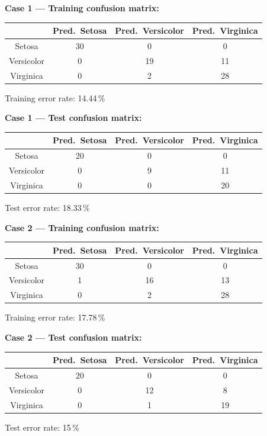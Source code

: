 \documentclass[11pt,a4paper]{article}
\begin{document}
\noindent\textbf{Case 1 --- Training confusion matrix:}
\begin{center}
\begin{tabular}{c|ccc}
\toprule
 & Pred.\ Setosa & Pred.\ Versicolor & Pred.\ Virginica \\
\midrule
Setosa     & 30 & 0 & 0 \\
Versicolor & 0 & 19 & 11 \\
Virginica  & 0 & 2 & 28 \\
\bottomrule
\end{tabular}
\end{center}
Training error rate: 14.44\,\%

\bigskip
\noindent\textbf{Case 1 --- Test confusion matrix:}
\begin{center}
\begin{tabular}{c|ccc}
\toprule
 & Pred.\ Setosa & Pred.\ Versicolor & Pred.\ Virginica \\
\midrule
Setosa     & 20 & 0 & 0 \\
Versicolor & 0 & 9 & 11 \\
Virginica  & 0 & 0 & 20 \\
\bottomrule
\end{tabular}
\end{center}
Test error rate: 18.33\,\%

\bigskip
\noindent\textbf{Case 2 --- Training confusion matrix:}
\begin{center}
\begin{tabular}{c|ccc}
\toprule
 & Pred.\ Setosa & Pred.\ Versicolor & Pred.\ Virginica \\
\midrule
Setosa     & 30 & 0 & 0 \\
Versicolor & 1 & 16 & 13 \\
Virginica  & 0 & 2 & 28 \\
\bottomrule
\end{tabular}
\end{center}
Training error rate: 17.78\,\%

\bigskip
\noindent\textbf{Case 2 --- Test confusion matrix:}
\begin{center}
\begin{tabular}{c|ccc}
\toprule
 & Pred.\ Setosa & Pred.\ Versicolor & Pred.\ Virginica \\
\midrule
Setosa     & 20 & 0 & 0 \\
Versicolor & 0 & 12 & 8 \\
Virginica  & 0 & 1 & 19 \\
\bottomrule
\end{tabular}
\end{center}
Test error rate: 15\,\%
\end{document}
